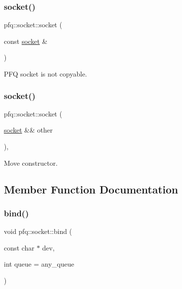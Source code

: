 \mbox{\label{classpfq_1_1socket_a517b6fdd622cdb2a64f2960176296f8d}} 
\subsubsection{\texorpdfstring{socket()}{socket()}\hspace{0.1cm}{\footnotesize\ttfamily [6/7]}}
{\footnotesize\ttfamily pfq\+::socket\+::socket (\begin{DoxyParamCaption}\item[{const \hyperlink{classpfq_1_1socket}{socket} \&}]{ }\end{DoxyParamCaption})\hspace{0.3cm}{\ttfamily [delete]}}



P\+FQ socket is not copyable. 

\mbox{\label{classpfq_1_1socket_a1a60820551f1601beb54649d9ae48fa2}} 
\subsubsection{\texorpdfstring{socket()}{socket()}\hspace{0.1cm}{\footnotesize\ttfamily [7/7]}}
{\footnotesize\ttfamily pfq\+::socket\+::socket (\begin{DoxyParamCaption}\item[{\hyperlink{classpfq_1_1socket}{socket} \&\&}]{other }\end{DoxyParamCaption})\hspace{0.3cm}{\ttfamily [inline]}, {\ttfamily [noexcept]}}



Move constructor. 



\subsection{Member Function Documentation}
\mbox{\label{classpfq_1_1socket_a3a0fc5c70e2d2615e29d06ac55007ed3}} 
\subsubsection{\texorpdfstring{bind()}{bind()}}
{\footnotesize\ttfamily void pfq\+::socket\+::bind (\begin{DoxyParamCaption}\item[{const char $\ast$}]{dev,  }\item[{int}]{queue = {\ttfamily any\+\_\+queue} }\end{DoxyParamCaption})\hspace{0.3cm}{\ttfamily [inline]}}



